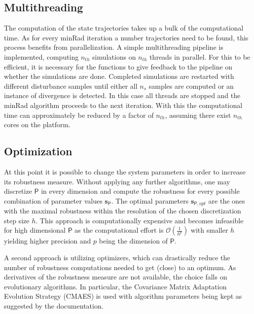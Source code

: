 \subsection{Multithreading} \label{mt}
    
    The computation of the state trajectories takes up a bulk of the computational time. As for every minRad iteration a number trajectories need to be found, this process benefits from parallelization. A simple multithreading pipeline is implemented, computing $n_{th}$ simulations on $n_{th}$ threads in parallel. For this to be efficient, it is necessary for the functions to give feedback to the pipeline on whether the simulations are done. Completed simulations are restarted with different disturbance samples until either all $n_s$ samples are computed or an instance of divergence is detected. In this case all threads are stopped and the minRad algorithm proceeds to the next iteration. 
    With this the computational time can approximately be reduced by a factor of $n_{th}$, assuming there exist $n_{th}$ cores on the platform. 

\subsection{Optimization} \label{opt}
    
    At this point it is possible to change the system parameters in order to increase its robustness measure.
    Without applying any further algorithms, one may discretize $\mathsf{P}$ in every dimension and compute the robustness for every possible combination of parameter values $\mathbf{s}_{\mathsf{P}}$. The optimal parameters $\mathbf{s}_{\mathsf{P},opt}$ are the ones with the maximal robustness within the resolution of the chosen discretization step size $h$. This approach is computationally expensive and becomes infeasible for high dimensional $\mathsf{P}$ as the computational effort is $\mathcal{O}(\frac{1}{h^p})$ with smaller $h$ yielding higher precision and $p$ being the dimension of $\mathsf{P}$. 
    
    A second approach is utilizing optimizers, which can drastically reduce the number of robustness computations needed to get (close) to an optimum. As derivatives of the robustness measure are not available, the choice falls on evolutionary algorithms. In particular, the Covariance Matrix Adaptation Evolution Strategy (CMAES) \cite{cmaes} is used with algorithm parameters being kept as suggested by the documentation. %


